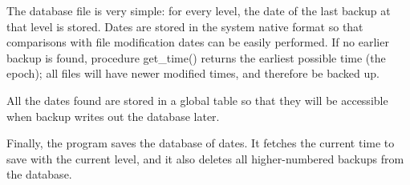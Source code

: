 The database file is very simple: for every level, the date of the last
backup at that level is stored. Dates are stored in the system native
format so that comparisons with file modification dates can be easily
performed. If no earlier backup is found, procedure
\textsf{get\_time()} returns the earliest possible time (the epoch);
all files will have newer modified times, and therefore be backed up.

All the dates found are stored in a global table so that they will be
accessible when \textsf{backup} writes out the database later. 


Finally, the program saves the database of dates. It fetches the current
time to save with the current level, and it also deletes all
higher-numbered backups from the database.


